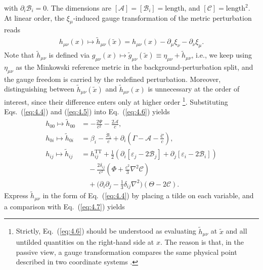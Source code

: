 \documentclass[aps,prd,twocolumn]{revtex4-2}
\newcommand\p{\partial}
\begin{document}
with $\p_i\mathcal{B}_i=0$. The dimensions are $[\mathcal{A}]=[\mathcal{B}_i]=\mathrm{length}$, and $[\mathcal{C}]=\mathrm{length}^2$. At linear order, the $\xi_\mu$-induced gauge transformation of the metric perturbation reads \cite{Flanagan2005.NewJPhys.7.204}
\begin{align}\label{eq:4.6}
  h_{\mu\nu}(x) \mapsto \tilde{h}_{\mu\nu}(\tilde{x}) = h_{\mu\nu}(x) - \p_\mu\xi_\nu - \p_\nu\xi_\mu.
\end{align}
Note that $\tilde{h}_{\mu\nu}$ is defined via $g_{\mu\nu}(x) \mapsto \tilde{g}_{\mu\nu}(\tilde{x}) \equiv \eta_{\mu\nu}+\tilde{h}_{\mu\nu}$, i.e., we keep using $\eta_{\mu\nu}$ as the Minkowski reference metric in the background-perturbation split, and the gauge freedom is carried by the redefined perturbation. Moreover, distinguishing between $\tilde{h}_{\mu\nu}(\tilde{x})$ and $\tilde{h}_{\mu\nu}(x)$ is unnecessary at the order of interest, since their difference enters only at higher order \footnote{Strictly, Eq.~(\ref{eq:4.6}) should be understood as evaluating $\tilde{h}_{\mu\nu}$ at $\tilde{x}$ and all untilded quantities on the right-hand side at $x$. The reason is that, in the passive view, a gauge transformation compares the same physical point described in two coordinate systems \cite{Mukhanov1992.PhysRep.215.203}.}. Substituting Eqs.~(\ref{eq:4.4}) and (\ref{eq:4.5}) into Eq.~(\ref{eq:4.6}) yields
\begin{subequations}\label{eq:4.7}
\begin{align}
  h_{00} \mapsto \tilde{h}_{00} &= -\frac{2\Psi}{c^2} - \frac{2\dot{\mathcal{A}}}{c}, \\
  h_{0i} \mapsto \tilde{h}_{0i} &= \beta_i - \frac{\dot{\mathcal{B}}_i}{c} + \p_i(\Gamma-\mathcal{A}-\frac{\dot{\mathcal{C}}}{c}), \\
  h_{ij} \mapsto \tilde{h}_{ij} &= h_{ij}^\mathrm{TT} + \frac{1}{2}(\p_i[\varepsilon_j-2\mathcal{B}_j] + \p_j[\varepsilon_i-2\mathcal{B}_i]) \nonumber\\ 
    &\quad - \frac{2\delta_{ij}}{c^2}(\Phi+\frac{c^2}{3}\nabla^2\mathcal{C}) \nonumber\\
    &\quad + \big(\p_i\p_j-\frac{1}{3}\delta_{ij}\nabla^2\big)(\Theta - 2\mathcal{C}).
\end{align}
\end{subequations}
Express $\tilde{h}_{\mu\nu}$ in the form of Eq.~(\ref{eq:4.4}) by placing a tilde on each variable, and a comparison with Eq.~(\ref{eq:4.7}) yields
\end{document}
